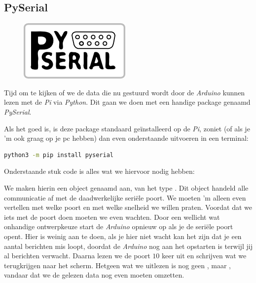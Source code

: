 \subsection{PySerial}

\begin{figure}[h!]
\centering\includegraphics[scale=0.75]{Pictures/chapter08/pyserial.png}
\label{fig:pyserial} %
\end{figure}

Tijd om te kijken of we de data die nu gestuurd wordt door de \textit{Arduino} kunnen lezen met de \textit{Pi} via \textit{Python}. Dit gaan we doen met een handige package genaamd \textit{PySerial}. 

\begin{remark}
  Als het goed is, is deze package standaard geïnstalleerd op de \textit{Pi}, zoniet (of als je 'm ook graag op je pc hebben) dan even onderstaande uitvoeren in een terminal:
  \begin{lstlisting}[language=bash]
    python3 -m pip install pyserial
  \end{lstlisting}
\end{remark}

Onderstaande stuk code is alles wat we hiervoor nodig hebben:

We maken hierin een object genaamd  aan, van het type . Dit object handeld alle communicatie af met de daadwerkelijke seriële poort. We moeten 'm alleen even vertellen met welke poort en met welke snelheid we willen praten.
Voordat dat we iets met de poort doen moeten we even wachten. \newline 
Door een wellicht wat onhandige ontwerpkeuze start de \textit{Arduino} opnieuw op als je de seriële poort opent. Hier is weinig aan te doen, als je hier niet wacht kan het zijn dat je een aantal berichten mis loopt, doordat de \textit{Arduino} nog aan het opstarten is terwijl jij al berichten verwacht. Daarna lezen we de poort $10$ keer uit en schrijven wat we terugkrijgen naar het scherm. Hetgeen wat we uitlezen is nog geen , maar , vandaar dat we de gelezen data nog even moeten omzetten. \newline

